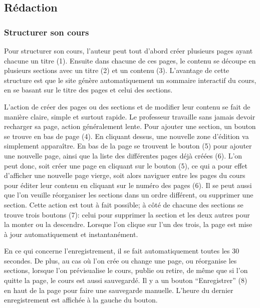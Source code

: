 \documentclass[a4paper,10pt,twoside]{sphinxmanual}
\begin{document}
\subsection{Rédaction}
\label{functionalities:redaction}

\subsubsection{Structurer son cours}
\label{functionalities:structurer-son-cours}
Pour structurer son cours, l'auteur peut tout d'abord créer plusieurs pages ayant chacune un titre (1). Ensuite dans chacune de ces pages, le contenu se découpe en plusieurs sections avec un titre (2) et un contenu (3). L'avantage de cette structure est que le site génère automatiquement un sommaire interactif du cours, en se basant sur le titre des pages et celui des sections.

L'action de créer des pages ou des sections et de modifier leur contenu se fait de manière claire, simple et surtout rapide. Le professeur travaille sans jamais devoir recharger sa page, action généralement lente. Pour ajouter une section, un bouton se trouve en bas de page (4). En cliquant dessus, une nouvelle zone d'édition va simplement apparaître. En bas de la page se trouvent le bouton (5) pour ajouter une nouvelle page, ainsi que la liste des différentes pages déjà créées (6). L'on peut donc, soit créer une page en cliquant sur le bouton (5), ce qui a pour effet d'afficher une nouvelle page vierge, soit alors naviguer entre les pages du cours pour éditer leur contenu en cliquant sur le numéro des pages (6). Il se peut aussi que l'on veuille réorganiser les sections dans un ordre différent, ou supprimer une section. Cette action est tout à fait possible; à côté de chacune des sections se trouve trois boutons (7): celui pour supprimer la section et les deux autres pour la monter ou la descendre. Lorsque l'on clique sur l'un des trois, la page est mise à jour automatiquement et instantanément.

En ce qui concerne l'enregistrement, il se fait automatiquement toutes les 30 secondes. De plus, au cas où l'on crée ou change une page, ou réorganise les sections, lorsque l'on prévisualise le cours, publie ou retire, de même que si l'on quitte la page, le cours est aussi sauvegardé. Il y a un bouton ``Enregistrer'' (8) en haut de la page pour faire une sauvegarde manuelle. L'heure du dernier enregistrement est affichée à la gauche du bouton.
\end{document}
